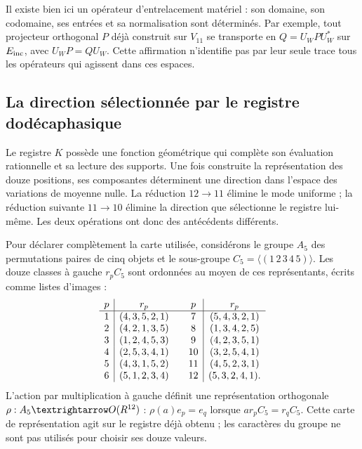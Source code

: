 Il existe bien ici un opérateur d'entrelacement matériel : son domaine, son codomaine, ses entrées et sa normalisation sont déterminés. Par exemple, tout projecteur orthogonal $P$ déjà construit sur $V_{11}$ se transporte en $Q=U_WPU_W^*$ sur $E_{\rm inc}$, avec $U_WP=QU_W$. Cette affirmation n'identifie pas par leur seule trace tous les opérateurs qui agissent dans ces espaces.


\subsection{La direction sélectionnée par le registre dodécaphasique}
\label{x_reciprocidad:exc:k-direccion}

Le registre \(K\) possède une fonction géométrique qui complète son évaluation rationnelle et sa lecture des supports. Une fois construite la représentation des douze positions, ses composantes déterminent une direction dans l'espace des variations de moyenne nulle. La réduction \(12\to11\) élimine le mode uniforme ; la réduction suivante \(11\to10\) élimine la direction que sélectionne le registre lui-même. Les deux opérations ont donc des antécédents différents.

Pour déclarer complètement la carte utilisée, considérons le groupe
\(A_5\) des permutations paires de cinq objets et le sous-groupe
\(C_5=\langle(1\,2\,3\,4\,5)\rangle\). Les douze classes à gauche
\(r_pC_5\) sont ordonnées au moyen de ces représentants, écrits comme
listes d'images :
\[
\begin{array}{c|c@{\qquad}c|c}
p&r_p&p&r_p\\ \hline
1&(4,3,5,2,1)&7&(5,4,3,2,1)\\
2&(4,2,1,3,5)&8&(1,3,4,2,5)\\
3&(1,2,4,5,3)&9&(4,2,3,5,1)\\
4&(2,5,3,4,1)&10&(3,2,5,4,1)\\
5&(4,3,1,5,2)&11&(4,5,2,3,1)\\
6&(5,1,2,3,4)&12&(5,3,2,4,1).
\end{array}
\]
L'action par multiplication à gauche définit une représentation
orthogonale \(\rho:A_5\to O(\RR^{12})\) :
\(\rho(a)e_p=e_q\) lorsque \(ar_pC_5=r_qC_5\).
Cette carte de représentation agit sur le registre déjà obtenu ;
les caractères du groupe ne sont pas utilisés pour choisir ses douze valeurs.

